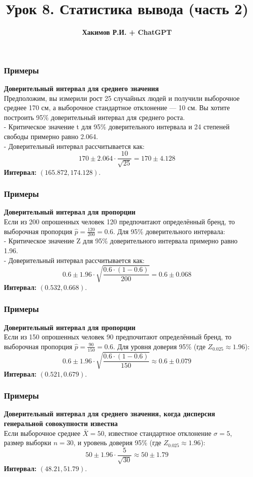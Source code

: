\documentclass[aspectratio=169]{beamer}
\title{\bf Урок 8. Статистика вывода (часть 2)}
\author{{\bf Хакимов Р.И. + ChatGPT}}
\date[\today]{}
\begin{document}
\begin{frame}
\titlepage
\end{frame}

\begin{frame}
\frametitle{Примеры}
{\bf Доверительный интервал для среднего значения}\\
Предположим, вы измерили рост 25 случайных людей и получили выборочное среднее 170 см, а выборочное стандартное отклонение — 10 см. Вы хотите построить 95\% доверительный интервал для среднего роста.\\
- Критическое значение t для 95\% доверительного интервала и 24 степеней свободы примерно равно 2.064.\\
- Доверительный интервал рассчитывается как:
  \[
  170 \pm 2.064 \cdot \frac{10}{\sqrt{25}} = 170 \pm 4.128
  \]
{\bf Интервал:} \( (165.872, 174.128) \).
\end{frame}

\begin{frame}
\frametitle{Примеры}
{\bf Доверительный интервал для пропорции}\\
Если из 200 опрошенных человек 120 предпочитают определённый бренд, то выборочная пропорция \( \hat{p} = \frac{120}{200} = 0.6 \). Для 95\% доверительного интервала:\\
- Критическое значение Z для 95\% доверительного интервала примерно равно 1.96.\\
- Доверительный интервал рассчитывается как:
  \[
  0.6 \pm 1.96 \cdot \sqrt{\frac{0.6 \cdot (1 - 0.6)}{200}} = 0.6 \pm 0.068
  \]
{\bf Интервал:} \( (0.532, 0.668) \).
\end{frame}

\begin{frame}
\frametitle{Примеры}
{\bf Доверительный интервал для пропорции}\\
Если из 150 опрошенных человек 90 предпочитают определённый бренд, то выборочная пропорция \( \hat{p} = \frac{90}{150} = 0.6 \). Для уровня доверия 95\% (где \( Z_{0.025} \approx 1.96 \)):
  \[
  0.6 \pm 1.96 \cdot \sqrt{\frac{0.6 \cdot (1 - 0.6)}{150}} \approx 0.6 \pm 0.079
  \]
{\bf Интервал:} \( (0.521, 0.679) \).
\end{frame}

\begin{frame}
\frametitle{Примеры}
{\bf Доверительный интервал для среднего значения, когда дисперсия генеральной совокупности известна}\\
Если выборочное среднее \( \bar{X} = 50 \), известное стандартное отклонение \( \sigma = 5 \), размер выборки \( n = 30 \), и уровень доверия 95\% (где \( Z_{0.025} \approx 1.96 \)):
  \[
  50 \pm 1.96 \cdot \frac{5}{\sqrt{30}} \approx 50 \pm 1.79
  \]
{\bf Интервал:} \( (48.21, 51.79) \).
\end{frame}
\end{document}
